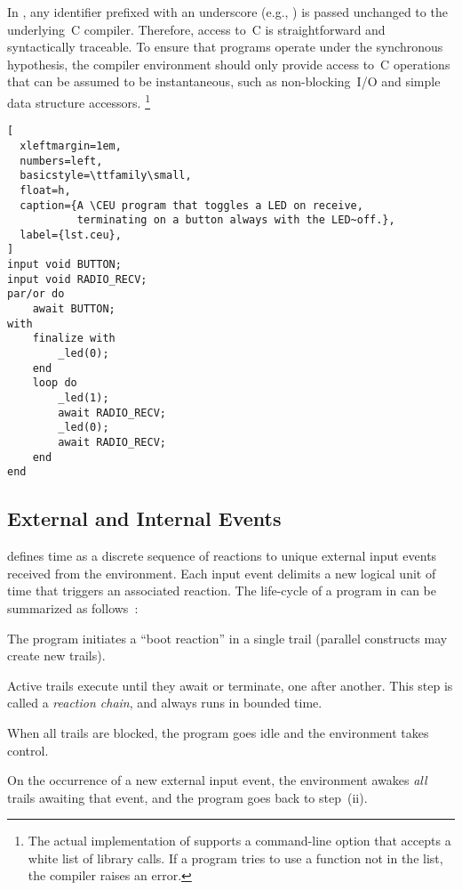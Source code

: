 In \CEU, any identifier prefixed with an underscore (e.g., ) is
passed unchanged to the underlying~C compiler.
%
Therefore, access to~C is straightforward and syntactically traceable.
%
To ensure that programs operate under the synchronous hypothesis, the compiler
environment should only provide access to~C operations that can be assumed to
be instantaneous, such as non-blocking~I/O and simple data structure accessors.%
\footnote {
The actual implementation of \CEU supports a command-line option that accepts a
white list of library calls.
If a program tries to use a function not in the list, the compiler raises an
error.
}

\begin{lstlisting}[
  xleftmargin=1em,
  numbers=left,
  basicstyle=\ttfamily\small,
  float=h,
  caption={A \CEU program that toggles a LED on receive,
           terminating on a button always with the LED~off.},
  label={lst.ceu},
]
input void BUTTON;
input void RADIO_RECV;
par/or do
    await BUTTON;
with
    finalize with
        _led(0);
    end
    loop do
        _led(1);
        await RADIO_RECV;
        _led(0);
        await RADIO_RECV;
    end
end
\end{lstlisting}

\vspace{-0.5cm}
\subsection{External and Internal Events}
\label{sec.ceu.evts}

\CEU defines time as a discrete sequence of reactions to unique external
input events received from the environment.
%
Each input event delimits a new logical unit of time that triggers an
associated reaction.
%
The life-cycle of a program in \CEU can be summarized as
follows~\cite{ceu.sensys13}:
%
\begin{enumerate:i}
\item The program initiates a ``boot reaction'' in a single trail (parallel
      constructs may create new trails).
\item Active trails execute until they await or terminate, one after
      another.  This step is called a \emph{reaction chain}, and always runs in
      bounded time.
\item When all trails are blocked, the program goes idle and the environment
      takes control.
\item On the occurrence of a new external input event, the environment
      awakes \emph{all} trails awaiting that event, and the program goes back to
      step~(ii).
\end{enumerate:i}

